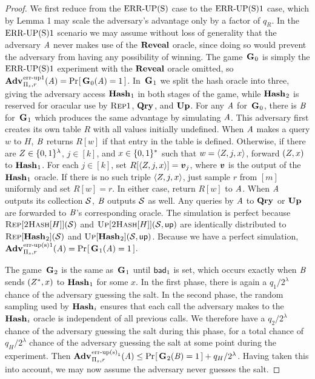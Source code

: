 \begin{proof} We first reduce from the $\textnormal{ERR\mbox{-}UP(S)}$ case to the $\textnormal{ERR\mbox{-}UP(S)}1$ case, which by Lemma 1 may scale the adversary's advantage only by a factor of $q_R$. In the $\textnormal{ERR\mbox{-}UP(S)}1$ scenario we may assume without loss of generality that the adversary $\mathit{A}$ never makes use of the $\mathbf{Reveal}$ oracle, since doing so would prevent the adversary from having any possibility of winning. The game~$\mathbf{G}\hspace{0.5pt}_0$ is simply the $\textnormal{ERR\mbox{-}UP(S)}1$ experiment with the $\mathbf{Reveal}$ oracle omitted, so $\Adv{\errep1}_{\struct_s,r}(\advA) = \Prob{\G_0(\advA) = 1}$. In~$\mathbf{G}\hspace{0.5pt}_1$ we split the hash oracle into three, giving the adversary access $\mathbf{Hash}\hspace{0.5pt}_1$ in both stages of the game, while $\mathbf{Hash}\hspace{0.5pt}_2$ is reserved for oracular use by $\textsc{Rep}1$, $\mathbf{Qry}\hspace{0.5pt}$, and $\mathbf{Up}\hspace{0.5pt}$. For any $\mathit{A}$ for~$\mathbf{G}\hspace{0.5pt}_0$, there is $\mathit{B}$ for~$\mathbf{G}\hspace{0.5pt}_1$ which produces the same advantage by simulating $\mathit{A}$. This adversary first creates its own table $R$ with all values initially undefined. When $\mathit{A}$ makes a query $w$ to $H$, $\mathit{B}$ returns $R[w]$ if that entry in the table is defined. Otherwise, if there are $Z \in \{0,1\}^\lambda$, $j \in [k]$, and $x \in \{0,1\}^*$ such that $w = \langle Z, j, x\rangle$, forward $(Z,x)$ to $\mathbf{Hash}\hspace{0.5pt}_1$. For each $j \in [k]$, set $R[\langle\salt, j, x\rangle] = \vv_j$, where $\vv$ is the output of the $\mathbf{Hash}\hspace{0.5pt}_1$ oracle. If there is no such triple $\langle Z, j, x\rangle$, just sample $r$ from $[m]$ uniformly and set $R[w] = r$. In either case, return $R[w]$ to $\mathit{A}$. When $\mathit{A}$ outputs its collection $\mathcal{S}$, $\mathit{B}$ outputs $\mathcal{S}$ as well. Any queries by $\mathit{A}$ to $\mathbf{Qry}\hspace{0.5pt}$ or $\mathbf{Up}\hspace{0.5pt}$ are forwarded to $\mathit{B}$'s corresponding oracle. The simulation is perfect because $\textsc{Rep}[\textsc{2Hash}[H]](\mathcal{S})$ and $\textsc{Up}[\textsc{2Hash}[H]](\mathcal{S},\mathsf{up})$ are identically distributed to $\textsc{Rep}[\mathbf{Hash}\hspace{0.5pt}_2](\mathcal{S})$ and $\textsc{Up}[\mathbf{Hash}\hspace{0.5pt}_2](\mathcal{S},\mathsf{up})$. Because we have a perfect simulation, $\Adv{\erreps1}_{\struct_s,r}(\advA) = \Prob{\G_1(\advA) = 1}$.

The game~$\mathbf{G}\hspace{0.5pt}_2$ is the same as~$\mathbf{G}\hspace{0.5pt}_1$ until $\mathsf{bad}_1$ is set, which occurs exactly when $\mathit{B}$ sends $(Z^*,x)$ to $\mathbf{Hash}\hspace{0.5pt}_1$ for some $x$. In the first phase, there is again a $q_1/2^\lambda$ chance of the adversary guessing the salt. In the second phase, the random sampling used by $\mathbf{Hash}\hspace{0.5pt}_i$ ensures that each call the adversary makes to the $\mathbf{Hash}\hspace{0.5pt}_i$ oracle is independent of all previous calls. We therefore have a $q_2/2^\lambda$ chance of the adversary guessing the salt during this phase, for a total chance of $q_H/2^\lambda$ chance of the adversary guessing the salt at some point during the experiment. Then $\Adv{\erreps_1}_{\struct_s,r}(\advA) \le \Prob{\G_2(\advB) = 1} + q_H/2^\lambda$. Having taken this into account, we may now assume the adversary never guesses the salt.


\end{proof}
